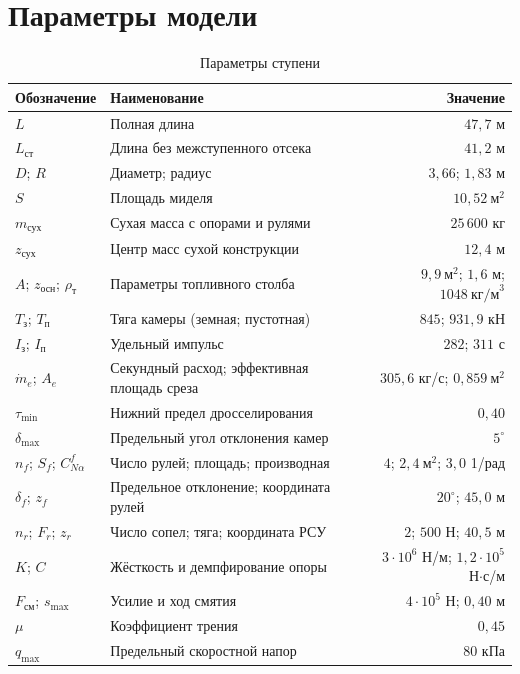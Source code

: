 \documentclass[11pt,a4paper]{article}
\begin{document}
\section{Параметры модели}

\begin{table}[htb]
\centering
\caption{Параметры ступени}
\label{tab:par}
\begin{tabular}{llr}
\toprule
Обозначение & Наименование & Значение \\
\midrule
$L$ & Полная длина & $47{,}7$ м \\
$L_{\text{ст}}$ & Длина без межступенного отсека & $41{,}2$ м \\
$D$; $R$ & Диаметр; радиус & $3{,}66$; $1{,}83$ м \\
$S$ & Площадь миделя & $10{,}52\ \text{м}^2$ \\
$m_{\text{сух}}$ & Сухая масса с опорами и рулями & $25\,600$ кг \\
$z_{\text{сух}}$ & Центр масс сухой конструкции & $12{,}4$ м \\
$A$; $z_{\text{осн}}$; $\rho_{\text{т}}$ & Параметры топливного столба
 & $9{,}9\ \text{м}^2$; $1{,}6$ м; $1048\ \text{кг/м}^3$ \\
$T_{\text{з}}$; $T_{\text{п}}$ & Тяга камеры (земная; пустотная)
 & $845$; $931{,}9$ кН \\
$I_{\text{з}}$; $I_{\text{п}}$ & Удельный импульс & $282$; $311$ с \\
$\dot m_e$; $A_e$ & Секундный расход; эффективная площадь среза
 & $305{,}6$ кг/с; $0{,}859\ \text{м}^2$ \\
$\tau_{\min}$ & Нижний предел дросселирования & $0{,}40$ \\
$\delta_{\max}$ & Предельный угол отклонения камер & $5^\circ$ \\
$n_f$; $S_f$; $C_{N\alpha}^f$ & Число рулей; площадь; производная
 & $4$; $2{,}4\ \text{м}^2$; $3{,}0$ 1/рад \\
$\delta_f$; $z_f$ & Предельное отклонение; координата рулей
 & $20^\circ$; $45{,}0$ м \\
$n_r$; $F_r$; $z_r$ & Число сопел; тяга; координата РСУ
 & $2$; $500$ Н; $40{,}5$ м \\
$K$; $C$ & Жёсткость и демпфирование опоры
 & $3{\cdot}10^6$ Н/м; $1{,}2{\cdot}10^5$ Н$\cdot$с/м \\
$F_{\text{см}}$; $s_{\max}$ & Усилие и ход смятия
 & $4{\cdot}10^5$ Н; $0{,}40$ м \\
$\mu$ & Коэффициент трения & $0{,}45$ \\
$q_{\max}$ & Предельный скоростной напор & $80$ кПа \\
\bottomrule
\end{tabular}
\end{table}
\end{document}
